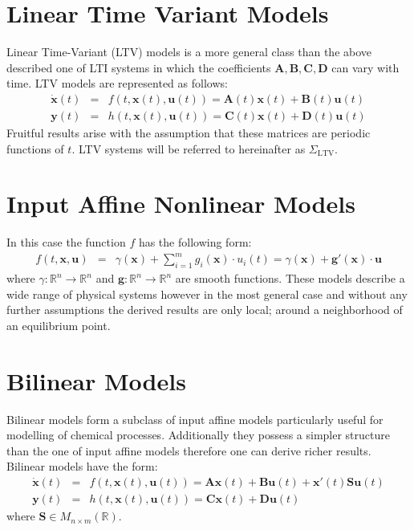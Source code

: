 \documentclass[a4paper,10pt,oneside]{book}
\begin{document}
\section{Linear Time Variant Models}
 Linear Time-Variant (LTV) models is a more general class than the above described one of LTI systems in which the coefficients $\mathbf{A},\mathbf{B},\mathbf{C},\mathbf{D}$ can vary with time. LTV models are represented as follows:
\begin{eqnarray}
 \dot{\mathbf{x}}(t)&=&f(t,\mathbf{x}(t),\mathbf{u}(t))=\mathbf{A}(t)\mathbf{x}(t)+\mathbf{B}(t)\mathbf{u}(t)\\
 \mathbf{y}(t)&=&h(t,\mathbf{x}(t),\mathbf{u}(t))=\mathbf{C}(t)\mathbf{x}(t)+\mathbf{D}(t)\mathbf{u}(t)
\end{eqnarray}
Fruitful results arise with the assumption that these matrices are periodic functions of $t$. LTV systems will be referred to hereinafter as $\Sigma_{\text{LTV}}$.


\section{Input Affine Nonlinear Models}
In this case the function $f$ has the following form:
\begin{eqnarray}
 f(t,\mathbf{x},\mathbf{u})&=&\gamma(\mathbf{x})+\sum_{i=1}^{m}g_i(\mathbf{x})\cdot u_i(t)=\gamma(\mathbf{x})+\mathbf{g}'(\mathbf{x})\cdot\mathbf{u}
\end{eqnarray}
where $\gamma:\mathbb{R}^n\rightarrow\mathbb{R}^n$ and $\mathbf{g}:\mathbb{R}^n\rightarrow\mathbb{R}^n$ are smooth functions. These models describe a wide range of physical systems however in the most general case and without any further assumptions the derived results are only local; around a neighborhood of an equilibrium point.

\section{Bilinear Models}
Bilinear models form a subclass of input affine models particularly useful for modelling of chemical processes. Additionally they possess a simpler structure than the one of input affine models therefore one can derive richer results. Bilinear models have the form:
\begin{eqnarray}
 \dot{\mathbf{x}}(t)&=&f(t,\mathbf{x}(t),\mathbf{u}(t))=\mathbf{A}\mathbf{x}(t)+\mathbf{B}\mathbf{u}(t)+\mathbf{x}'(t)\mathbf{Su}(t)\\
 \mathbf{y}(t)&=&h(t,\mathbf{x}(t),\mathbf{u}(t))=\mathbf{C}\mathbf{x}(t)+\mathbf{D}\mathbf{u}(t)
\end{eqnarray}
where $\mathbf{S}\in M_{n\times m}(\mathbb{R})$.
\end{document}
